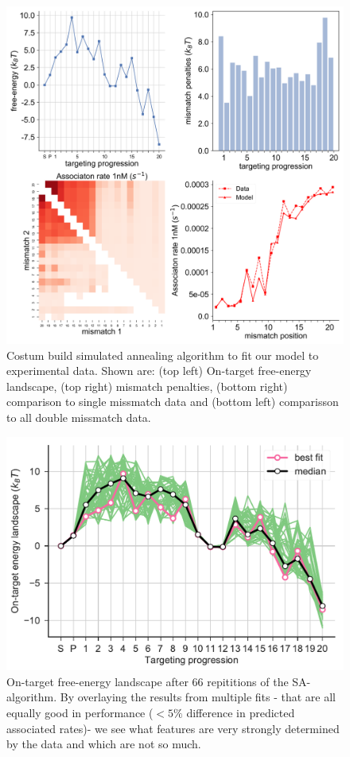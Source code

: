 \documentclass[a4paper,twoside]{revtex4-1}
\begin{document}
\begin{figure}[H]
	\centering
	\includegraphics[width=\textwidth]{frame_800}
	\caption{Costum build simulated annealing algorithm to fit our model to experimental data. Shown are: (top left) On-target free-energy landscape, (top right) mismatch penalties, (bottom right) comparison to single missmatch data and (bottom left) comparisson to all double missmatch data.  }
\end{figure}


\begin{figure}[H]
	\centering
	\includegraphics[scale=0.75]{all_fits_to_Boyle}
	\caption{On-target free-energy landscape after 66 repititions of the SA-algorithm. By overlaying the results from multiple fits - that are all equally good in performance ($<5\%$ difference in predicted associated rates)- we see what features are very strongly determined by the data and which are not so much. }
\end{figure}
\end{document}
